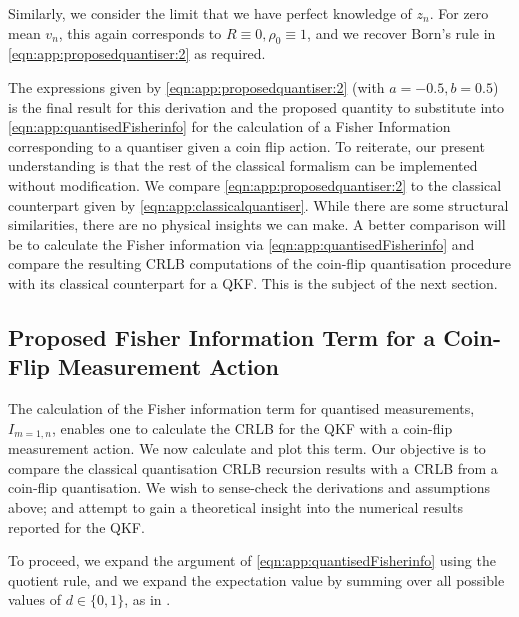 Similarly, we consider the limit that we have perfect knowledge of $z_n$. For zero mean $v_n$, this again corresponds to $R\equiv0, \rho_0 \equiv 1$, and we recover Born's rule in \cref{eqn:app:proposedquantiser:2} as required. 

The expressions given by \cref{eqn:app:proposedquantiser:2} (with $a= -0.5, b=0.5$) is the final result for this derivation and the proposed quantity to substitute into \cref{eqn:app:quantisedFisherinfo} for the calculation of a Fisher Information corresponding to a quantiser given a coin flip action. To reiterate, our present understanding is that the rest of the classical formalism can be implemented without modification. We compare \cref{eqn:app:proposedquantiser:2} to the classical counterpart given by  \cref{eqn:app:classicalquantiser}. While there are some structural similarities, there are no physical insights we can make. A better comparison will be to calculate the Fisher information via \cref{eqn:app:quantisedFisherinfo} and compare the resulting CRLB computations of the coin-flip quantisation procedure with its classical counterpart for a QKF. This is the subject of the next section. 


\subsection{Proposed Fisher Information Term for a Coin-Flip Measurement Action}

The calculation of the Fisher information term for quantised measurements, $I_{m=1, n}$, enables one to calculate the CRLB for the QKF with a coin-flip measurement action. We now calculate and plot this term. Our objective is to compare the classical quantisation CRLB recursion results with a CRLB from a coin-flip quantisation. We wish to sense-check the derivations and assumptions above; and attempt to gain a theoretical insight into the numerical results reported for the QKF. 

To proceed, we expand the argument of \cref{eqn:app:quantisedFisherinfo} using the quotient rule, and we expand the expectation value by summing over all possible values of $d\in \{0,1 \}$, as in \cite{karlsson2005}. 

